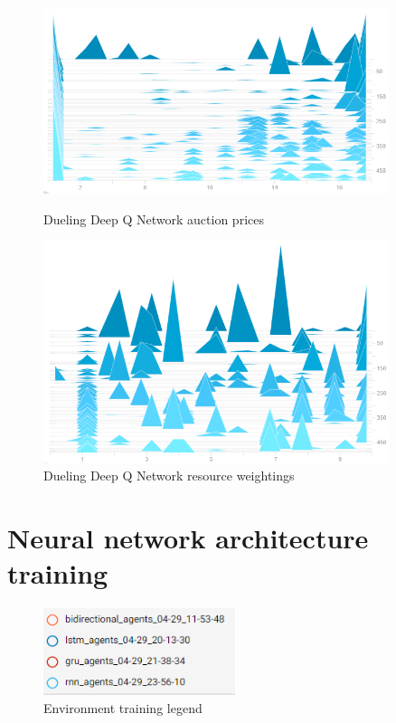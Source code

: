 \begin{figure}
    \centering
    \begin{minipage}{0.45\textwidth}
        \centering
        \includegraphics[width=0.9\textwidth]{figures/algo_training_fig/dueling_dqn_auction_prices.png}
        \caption{Dueling Deep Q Network auction prices}
        \label{fig:dueling-dqn-auction-prices}
    \end{minipage}\hfill
    \begin{minipage}{0.45\textwidth}
        \centering
        \includegraphics[width=0.9\textwidth]{figures/algo_training_fig/dueling_dqn_weightings.png}
        \caption{Dueling Deep Q Network resource weightings}
        \label{fig:dueling-dqn-resource-weightings}
    \end{minipage}
\end{figure}

\section{Neural network architecture training}\label{sec:neural-network-architecture-training}

\begin{figure}
    \includegraphics[width=0.5\textwidth]{figures/net_arch_training_fig/network_architecture_legend.png}
    \caption{Environment training legend}
    \label{fig:net-arch-training-legend}
\end{figure}

